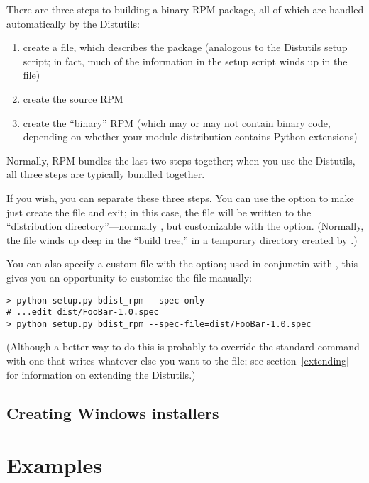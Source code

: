 \documentclass{howto}
\begin{document}
There are three steps to building a binary RPM package, all of which are 
handled automatically by the Distutils:
\begin{enumerate}
\item create a  file, which describes the package (analogous 
  to the Distutils setup script; in fact, much of the information in the 
  setup script winds up in the  file)
\item create the source RPM
\item create the ``binary'' RPM (which may or may not contain binary
  code, depending on whether your module distribution contains Python
  extensions)
\end{enumerate}
Normally, RPM bundles the last two steps together; when you use the
Distutils, all three steps are typically bundled together.

If you wish, you can separate these three steps.  You can use the
 option to make  just
create the  file and exit; in this case, the 
file will be written to the ``distribution directory''---normally
, but customizable with the 
option.  (Normally, the  file winds up deep in the ``build
tree,'' in a temporary directory created by .)

You can also specify a custom  file with the
 option; used in conjunctin with
, this gives you an opportunity to customize
the  file manually:
\begin{verbatim}
> python setup.py bdist_rpm --spec-only
# ...edit dist/FooBar-1.0.spec
> python setup.py bdist_rpm --spec-file=dist/FooBar-1.0.spec
\end{verbatim}
(Although a better way to do this is probably to override the standard
 command with one that writes whatever else you want
to the  file; see section~\ref{extending} for information on
extending the Distutils.)


\subsection{Creating Windows installers}
\label{creating-wininst}



\section{Examples}
\label{examples}
\end{document}
